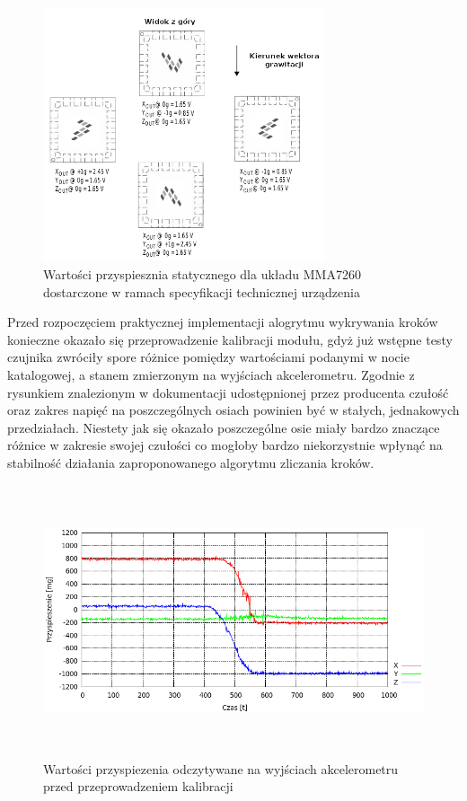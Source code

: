 \begin{figure}[ht!]
 \centering
 \includegraphics[height=75mm]{../images/ch04/mma7260_datasheet.png}
 \caption{Wartości przyspiesznia statycznego dla układu MMA7260 dostarczone w
 ramach specyfikacji technicznej urządzenia\cite{MMA7260DataSheet}}
 \label{fig:MMADataSheetStaticAcc}
\end{figure}

Przed rozpoczęciem praktycznej implementacji alogrytmu wykrywania kroków
konieczne okazało się przeprowadzenie kalibracji modułu, gdyż już wstępne testy
czujnika zwróciły spore różnice pomiędzy wartościami podanymi w nocie
katalogowej, a stanem zmierzonym na wyjściach akcelerometru. Zgodnie z rysunkiem
znalezionym w dokumentacji udostępnionej przez producenta czułość oraz zakres
napięć na poszczególnych osiach powinien być w stałych, jednakowych
przedziałach. Niestety jak się okazało poszczególne osie miały bardzo znaczące
różnice w zakresie swojej czułości co mogłoby bardzo niekorzystnie wpłynąć na
stabilność działania zaproponowanego algorytmu zliczania kroków. 

\begin{figure}[ht!]
 \centering
 \includegraphics[height=80mm]{../images/ch04/raw_acc_data.png}
 \caption{Wartości przyspiezenia odczytywane na wyjściach akcelerometru przed
 przeprowadzeniem kalibracji}
 \label{fig:MMADataRaw}
\end{figure}

